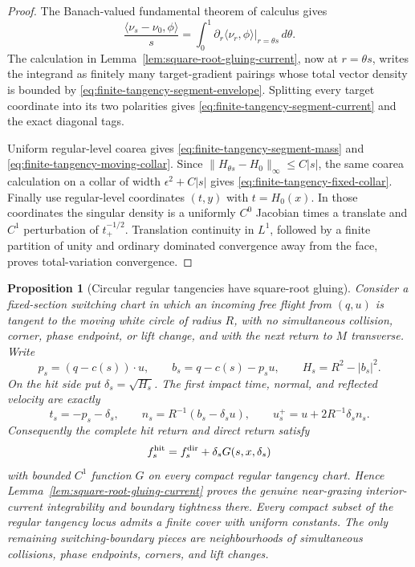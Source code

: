\documentclass[11pt]{article}
\newtheorem{proposition}[theorem]{Proposition}
\begin{document}
\begin{proof}
The Banach-valued fundamental theorem of calculus gives
\[
 \frac{\langle\nu_s-\nu_0,\phi\rangle}{s}
 =\int_0^1
 \left.\partial_r\langle\nu_r,\phi\rangle
 \right|_{r=\theta s}\,d\theta.
\]
The calculation in Lemma~\ref{lem:square-root-gluing-current}, now at
$r=\theta s$, writes the integrand as finitely many target-gradient
pairings whose total vector density is bounded by
\eqref{eq:finite-tangency-segment-envelope}.  Splitting every target
coordinate into its two polarities gives
\eqref{eq:finite-tangency-segment-current} and the exact diagonal tags.

Uniform regular-level coarea gives
\eqref{eq:finite-tangency-segment-mass} and
\eqref{eq:finite-tangency-moving-collar}.  Since
$\|H_{\theta s}-H_0\|_\infty\le C|s|$, the same coarea calculation on a
collar of width $\epsilon^2+C|s|$ gives
\eqref{eq:finite-tangency-fixed-collar}.  Finally use regular-level
coordinates $(t,y)$ with $t=H_0(x)$.  In those coordinates the singular
density is a uniformly $C^0$ Jacobian times a translate and $C^1$
perturbation of $t_+^{-1/2}$.  Translation continuity in $L^1$, followed
by a finite partition of unity and ordinary dominated convergence away
from the face, proves total-variation convergence.
\end{proof}

\begin{proposition}[Circular regular tangencies have square-root gluing]
\label{prop:fixed-section-square-root-tangency}
Consider a fixed-section switching chart in which an incoming free flight
from $(q,u)$ is tangent to the moving white circle of radius $R$, with no
simultaneous collision, corner, phase endpoint, or lift change, and with the
next return to $M$ transverse.  Write
\begin{equation}
\label{eq:circular-tangency-discriminant}
 p_s=(q-c(s))\cdot u,\qquad
 b_s=q-c(s)-p_su,\qquad
 H_s=R^2-|b_s|^2.
\end{equation}
On the hit side put $\delta_s=\sqrt{H_s}$.  The first impact time, normal,
and reflected velocity are exactly
\begin{equation}
\label{eq:circular-tangency-root-reflection}
 t_s=-p_s-\delta_s,\qquad
 n_s=R^{-1}(b_s-\delta_su),\qquad
 u_s^+=u+2R^{-1}\delta_sn_s.
\end{equation}
Consequently the complete hit return and direct return satisfy
\begin{equation}
\label{eq:fixed-section-square-root-gluing}
 f_s^{\rm hit}=f_s^{\rm dir}
 +\delta_sG(s,x,\delta_s)
\end{equation}
with bounded $C^1$ function $G$ on every compact regular tangency chart.
Hence Lemma~\ref{lem:square-root-gluing-current} proves the genuine
near-grazing interior-current integrability and boundary tightness there.
Every compact subset of the regular tangency locus admits a finite cover
with uniform constants.  The only remaining switching-boundary pieces are
neighbourhoods of simultaneous collisions, phase endpoints, corners, and
lift changes.
\end{proposition}
\end{document}
